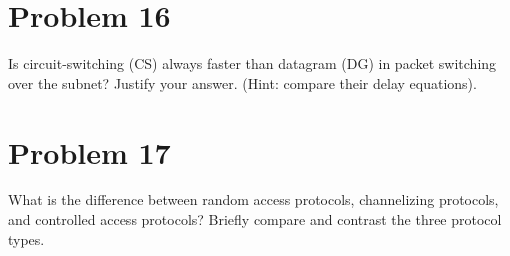 \documentclass{article}
\begin{document}
\section*{Problem 16}
Is circuit-switching (CS) always faster than datagram (DG) in packet switching over the
subnet? Justify your answer. (Hint: compare their delay equations).\\

\section*{Problem 17}
What is the difference between random access protocols, channelizing protocols, and
controlled access protocols? Briefly compare and contrast the three protocol types.\\
\end{document}
